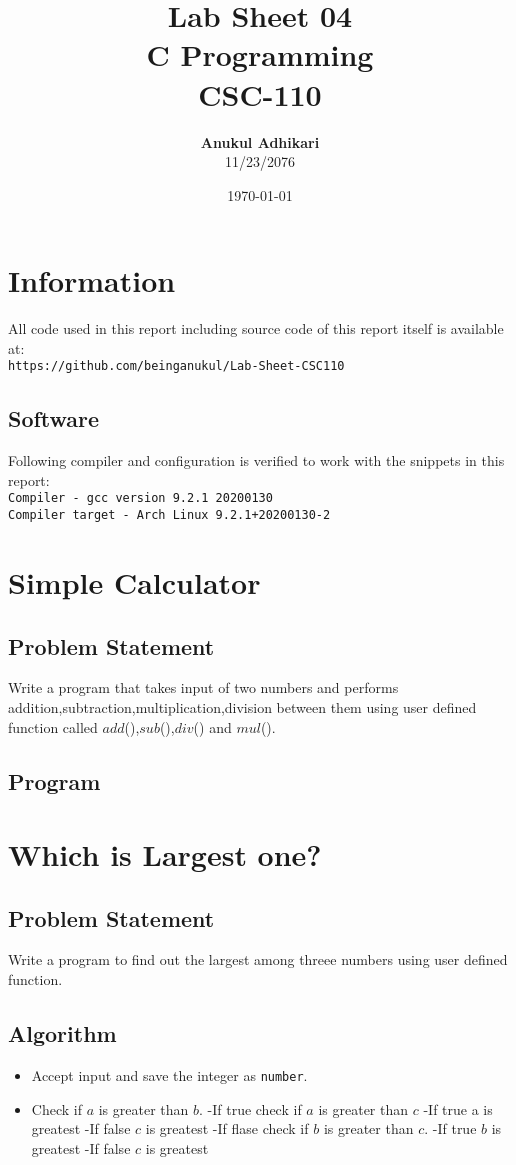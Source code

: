 \documentclass[11pt]{report}
\title{Lab Sheet 04 \\
      \textbf{C Programming} \\
      CSC-110}
\author{\textbf{Anukul Adhikari} \\ 11/23/2076}
\date{\today}
\begin{document}
\maketitle

\chapter*{Information}
All code used in this report including source code of this report itself is available at:\\ \texttt{https://github.com/beinganukul/Lab-Sheet-CSC110}
\section*{Software}
Following compiler and configuration is verified to work with the snippets in this report:\\
\texttt{Compiler - gcc version 9.2.1 20200130\\
Compiler target - Arch Linux 9.2.1+20200130-2
}

\tableofcontents

\chapter{Simple Calculator}
\section{Problem Statement}
Write a program that takes input of two numbers and performs addition,subtraction,multiplication,division between them using user defined function called $add$(),$sub$(),$div$() and $mul$().
\section{Program}


\chapter{Which is Largest one?}
\section{Problem Statement}
Write a program to find out the largest among threee numbers using user defined function.
\section{Algorithm}
\begin{itemize}
  \item Accept input and save the integer as \texttt{number}.
  \item Check if $a$ is greater than $b$.
  \subitem -If true check if $a$ is greater than $c$
  \subitem -If true a is greatest 
  \subsubitem -If false $c$ is greatest
  \subitem -If flase check if $b$ is greater than $c$.
  \subitem -If true $b$ is greatest 
  \subsubitem -If false $c$ is greatest
\end{itemize}
\leavevmode
\end{document}
